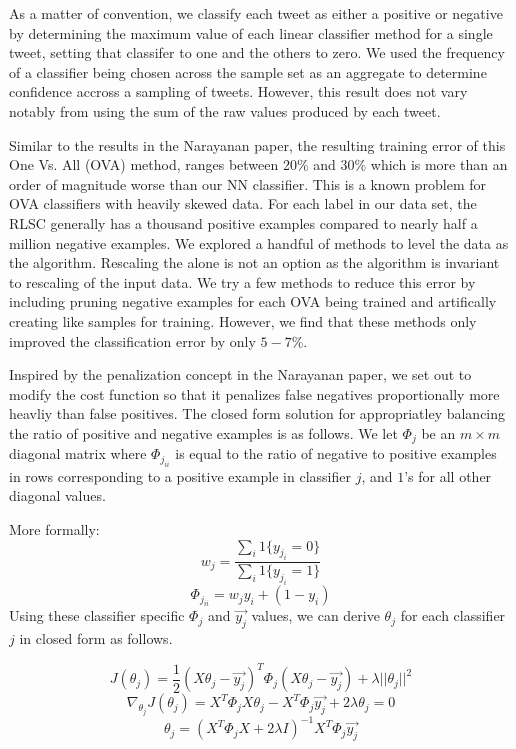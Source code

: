 \documentclass[10pt, conference, compsocconf]{IEEEtran}
\begin{document}
As a matter of convention, we classify each tweet as either a positive
or negative by determining the maximum value of each linear classifier
method for a single tweet, setting that classifer to one and the
others to zero.  We used the frequency of a classifier being chosen
across the sample set as an aggregate to determine confidence accross
a sampling of tweets.  However, this result does not vary notably from
using the sum of the raw values produced by each tweet.
  
Similar to the results in the Narayanan paper, the resulting training
error of this One Vs. All (OVA) method, ranges between 20\% and 30\%
which is more than an order of magnitude worse than our NN classifier.
This is a known problem for OVA classifiers with heavily skewed
data. For each label in our data set, the RLSC generally has a
thousand positive examples compared to nearly half a million negative
examples. We explored a handful of methods to level the data as the
algorithm.  Rescaling the alone is not an option as the algorithm is
invariant to rescaling of the input data. We try a few methods
\cite{Schapire} to reduce this error by including pruning \cite{Dekel}
negative examples for each OVA being trained and artifically creating
like samples for training.  However, we find that these methods only
improved the classification error by only $5-7\%$.

Inspired by the penalization concept in the Narayanan paper, we set
out to modify the cost function so that it penalizes false negatives
proportionally more heavliy than false positives. The closed form
solution for appropriatley balancing the ratio of positive and
negative examples is as follows. We let $\Phi_j$ be an $m \times m$
diagonal matrix where $\Phi_{j_{ii}}$ is equal to the ratio of
negative to positive examples in rows corresponding to a positive
example in classifier $j$, and $1$'s for all other diagonal values.

More formally:
$$w_{j} = \frac{\sum_{i}{1\{y_{j_i}=0\}}}{\sum_{i}{1\{y_{j_i}=1\}}}$$
$$\Phi_{j_{ii}} = w_{j}y_{i} + (1-y_i)$$
Using these classifier specific $\Phi_j$ and $\vec{y_j}$ values, we can
derive $\theta_j$ for each classifier $j$ in closed form as follows.

$$J(\theta_j) = \frac{1}{2} (X\theta_j - \vec{y_j})^T \Phi_j (X\theta_j-\vec{y_j}) + \lambda ||\theta_j||^2 $$
$$ \nabla_{\theta_j} J(\theta_j) = X^T \Phi_j X \theta_j -X^T \Phi_j \vec{y_j} +2 \lambda \theta_j = 0$$
$$ \theta_j= (X^T\Phi_j X+2 \lambda I)^{-1} X^T \Phi_j \vec{y_j}$$
\end{document}

